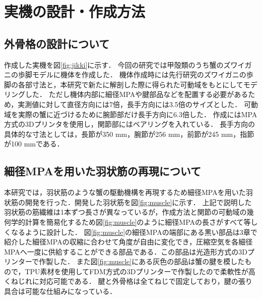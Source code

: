 \documentclass{jarticle}
\begin{document}
\vspace*{-2mm}
\section{実機の設計・作成方法}
\vspace*{-1mm}
\subsection{外骨格の設計について}

作成した実機を図\ref{fig:jikki}に示す．
今回の研究では甲殻類のうち蟹のズワイガニの歩脚モデルに機体を作成した．
機体作成時には先行研究\cite{crabrobot2}のズワイガニの歩脚の各部寸法と，本研究で新たに解剖した際に得られた可動域をもとにしてモデリングした．
ただし機体内部に細径MPAや腱部品などを配置する必要があるため，実測値に対して直径方向には7倍，長手方向には3.5倍のサイズとした．
可動域を実際の蟹に近づけるために腕節部だけ長手方向に6.3倍した．
作成にはMPA方式の3Dプリンタを使用し，関節部にはベアリングを入れている．
長手方向の具体的な寸法としては，長節が350 mm，腕節が256 mm，前節が245 mm，指節が100 mmである．
\vspace{-1mm}
\subsection{細径MPAを用いた羽状筋の再現について}

本研究では，羽状筋のような蟹の駆動機構を再現するため細径MPAを用いた羽状筋の開発を行った．開発した羽状筋を図\ref{fig:muscle}に示す．
上記で説明した羽状筋の筋繊維は1本ずつ長さが異なっているが，作成方法と関節の可動域の幾何学的計算を簡易化するため図\ref{fig:muscle}のように細径MPAの長さがすべて等しくなるように設計した．
図\ref{fig:muscle}の細径MPAの端部にある黒い部品は3章で紹介した細径MPAの収縮に合わせて角度が自由に変化でき，圧縮空気を各細径MPAへ一度に供給することができる部品である．この部品は光造形方式の3Dプリンターで作製した．
また図\ref{fig:muscle}にある灰色の部品は蟹の腱を模したもので，TPU素材を使用してFDM方式の3Dプリンターで作製したので柔軟性が高くねじれに対応可能である．
腱と外骨格は全てねじで固定しており，腱の張り具合は可能な仕組みになっている．
\end{document}
